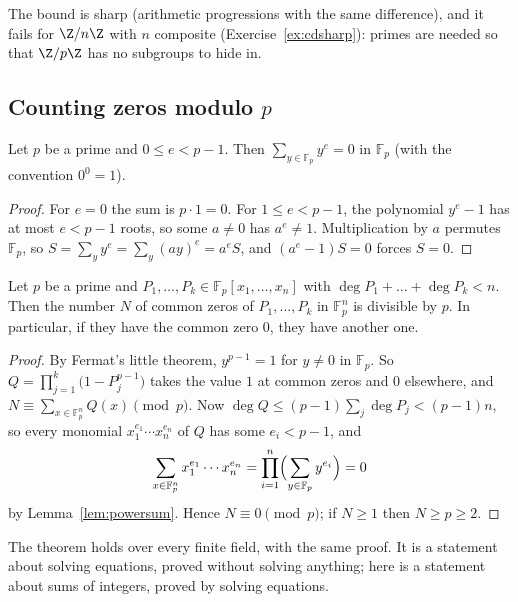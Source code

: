 The bound is sharp (arithmetic progressions with the same difference), and it fails for $\Z/n\Z$ with $n$ composite (Exercise~\ref{ex:cdsharp}): primes are needed so that $\Z/p\Z$ has no subgroups to hide in.

\subsection*{Counting zeros modulo $p$}

\begin{lemma}\label{lem:powersum}
Let $p$ be a prime and $0\le e<p-1$. Then $\sum_{y\in\mathbb F_p}y^e=0$ in $\mathbb F_p$ (with the convention $0^0=1$).
\end{lemma}
\begin{proof}
For $e=0$ the sum is $p\cdot1=0$. For $1\le e<p-1$, the polynomial $y^e-1$ has at most $e<p-1$ roots, so some $a\ne0$ has $a^e\ne1$. Multiplication by $a$ permutes $\mathbb F_p$, so
$S=\sum_yy^e=\sum_y(ay)^e=a^eS$, and $(a^e-1)S=0$ forces $S=0$.
\end{proof}

\begin{theorem}\label{thm:cw}
Let $p$ be a prime and $P_1,\dots,P_k\in\mathbb F_p[x_1,\dots,x_n]$ with $\deg P_1+\dots+\deg P_k<n$. Then the number $N$ of common zeros of $P_1,\dots,P_k$ in $\mathbb F_p^n$ is divisible by $p$. In particular, if they
have the common zero $0$, they have another one.
\end{theorem}
\begin{proof}
By Fermat's little theorem, $y^{p-1}=1$ for $y\ne0$ in $\mathbb F_p$. So $Q=\prod_{j=1}^k\bigl(1-P_j^{p-1}\bigr)$ takes the value $1$ at common zeros and $0$ elsewhere, and $N\equiv\sum_{x\in\mathbb F_p^n}Q(x)\pmod p$. Now
$\deg Q\le(p-1)\sum_j\deg P_j<(p-1)n$, so every monomial $x_1^{e_1}\cdots x_n^{e_n}$ of $Q$ has some $e_i<p-1$, and
\[
\sum_{x\in\mathbb F_p^n}x_1^{e_1}\cdots x_n^{e_n}=\prod_{i=1}^n\Bigl(\sum_{y\in\mathbb F_p}y^{e_i}\Bigr)=0
\]
by Lemma~\ref{lem:powersum}. Hence $N\equiv0\pmod p$; if $N\ge1$ then $N\ge p\ge2$.
\end{proof}

The theorem holds over every finite field, with the same proof. It is a statement about solving equations, proved without solving anything; here is a statement about sums of integers, proved by solving equations.

